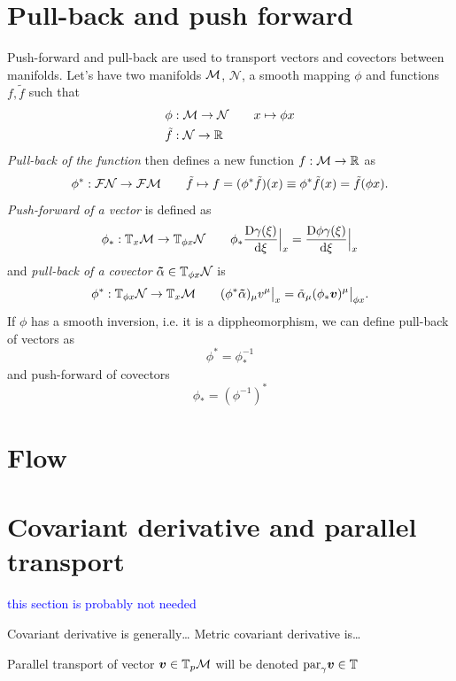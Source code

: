\section{Pull-back and push forward}
Push-forward and pull-back are used to transport vectors and covectors between manifolds. Let's have two manifolds $\mathcal{M}$, $\mathcal{N}$, a smooth mapping $\phi$ and functions $f,\tilde f$ such that
\begin{align*}
    \phi&:\mathcal{M}\rightarrow \mathcal{N}\qquad x\mapsto \phi x\\
    \tilde f&:\mathcal{N}\rightarrow \mathbb{R} 
\end{align*}
\emph{Pull-back of the function} then defines a new function $
f:\mathcal{M}\rightarrow \mathbb{R} $ as
$$\phi^*:\mathcal{F} \mathcal{N}\rightarrow \mathcal{F}\mathcal{M} \qquad  \tilde f\mapsto f=(\phi^*\tilde f)(x)\equiv \phi^*\tilde f(x) =\tilde f(\phi x).$$
\emph{Push-forward of a vector} is defined as
$$\phi_*: \mathbb{T}_x\mathcal{M} \rightarrow \mathbb{T}_{\phi x}\mathcal N\qquad \phi_* 
\frac{\mathrm{D} \gamma(\xi)}{\mathrm{d} \xi}\Big|_x=\frac{\mathrm{D} \phi \gamma(\xi)}{\mathrm{d} \xi}\Big|_x$$
and \emph{pull-back of a covector} $\bm\tilde\alpha\in \mathbb{T}_{\phi x}\mathcal N$ is
$$\phi^*: \mathbb{T}_{\phi x}\mathcal N\rightarrow \mathbb{T}_x\mathcal{M}  \qquad (\phi^*\bm \tilde\alpha)_\mu v^\mu\big|_x= \tilde\alpha_\mu (\phi_* \bm v)^\mu\big|_{\phi x}.$$
If $\phi$ has a smooth inversion, i.e. it is a dippheomorphism, we can define pull-back of vectors as
\begin{equation}
    \phi^*=\phi_*^{-1}
\end{equation}
and push-forward of covectors
\begin{equation}
    \phi_*=(\phi^{-1})^*
\end{equation}

\section{Flow}
\section{Covariant derivative and parallel transport}
\textcolor{blue}{this section is probably not needed}


Covariant derivative is generally\dots
Metric covariant derivative is\dots

Parallel transport of vector $\bm v\in \mathbb{T}_p \mathcal{M}$ will be denoted $\textrm{par}_\gamma \bm v\in \mathbb{T}_{}$


